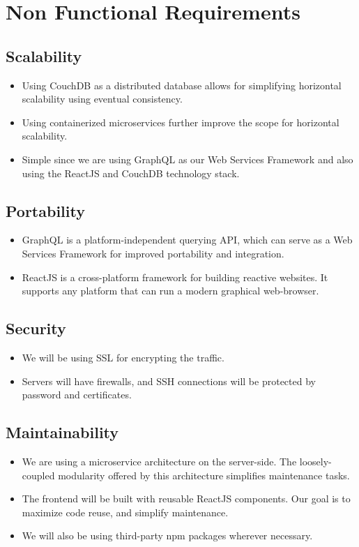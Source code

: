 \section{Non Functional Requirements}

\subsection{Scalability}
\begin{itemize}
    \item Using CouchDB as a distributed database allows for simplifying 
    horizontal scalability using eventual consistency.
    \item Using containerized microservices further improve the scope for horizontal scalability.
    \item Simple since we are using GraphQL as our Web Services Framework 
    and also using the ReactJS and CouchDB technology stack.
\end{itemize}

\subsection{Portability}
\begin{itemize}
    \item GraphQL is a platform-independent querying API, 
    which can serve as a Web Services Framework for improved portability and integration.
    \item ReactJS is a cross-platform framework for building reactive websites. 
    It supports any platform that can run a modern graphical web-browser.
\end{itemize}

\subsection{Security}
\begin{itemize}
    \item We will be using SSL for encrypting the traffic.
    \item Servers will have firewalls, and SSH connections will be protected by password and certificates.
\end{itemize}

\subsection{Maintainability}
\begin{itemize}
    \item We are using a microservice architecture on the server-side. 
    The loosely-coupled modularity offered by this architecture simplifies maintenance tasks.
    \item The frontend will be built with reusable ReactJS components. 
    Our goal is to maximize code reuse, and simplify maintenance.
    \item We will also be using third-party npm packages wherever necessary.
\end{itemize}

